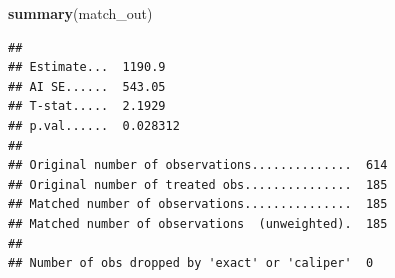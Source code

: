 \documentclass[ignorenonframetext,]{beamer}
\newenvironment{Shaded}{\begin{snugshade}}{\end{snugshade}}
\newcommand{\KeywordTok}[1]{\textcolor[rgb]{0.13,0.29,0.53}{\textbf{#1}}}
\newcommand{\NormalTok}[1]{#1}
\begin{document}
\begin{frame}[fragile]
\begin{table}[ht]
\centering
\caption{Covariate Balance in Matched Data} 
\label{tab:matched-bal}
\end{table}

\end{frame}

\begin{frame}[fragile]

\begin{Shaded}
\begin{Highlighting}[]
\KeywordTok{summary}\NormalTok{(match_out)}
\end{Highlighting}
\end{Shaded}

\begin{verbatim}
## 
## Estimate...  1190.9 
## AI SE......  543.05 
## T-stat.....  2.1929 
## p.val......  0.028312 
## 
## Original number of observations..............  614 
## Original number of treated obs...............  185 
## Matched number of observations...............  185 
## Matched number of observations  (unweighted).  185 
## 
## Number of obs dropped by 'exact' or 'caliper'  0
\end{verbatim}

\end{frame}
\end{document}
